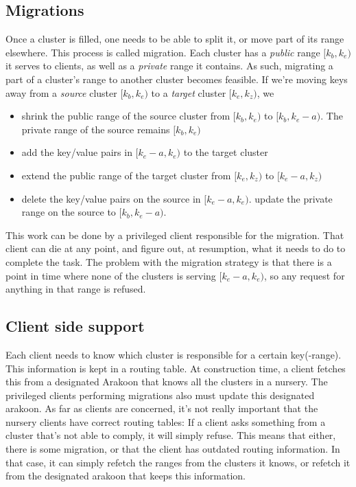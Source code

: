 \subsection{Migrations}
Once a cluster is filled, one needs to be able to split it, or move part of its range elsewhere. This process is called migration.
Each cluster has a \emph{public} range $[k_b,k_e)$ it serves to clients, as well as a \emph{private} range it contains. 
As such, migrating a part of a cluster's range to another cluster becomes feasible. 
If we're moving keys away from a \emph{source} cluster $[k_b, k_e)$ 
to a \emph{target} cluster $[k_e, k_z)$, we
\begin{itemize}
\item{} shrink the public range of the source cluster from 
$[k_b, k_e)$ to $[k_b, k_e - a)$. 
The private range of the source remains $[k_b, k_e)$
\item{} add the key/value pairs in $[k_e - a,k_e)$ to the target cluster
\item{} extend the public range of the target cluster from
$[k_e,k_z)$ to $[k_e - a, k_z)$
\item{} delete the key/value pairs on the source in $[k_e -a,k_e)$.
        update the private range on the source to $[k_b, k_e-a)$.
\end{itemize}
This work can be done by a privileged client responsible for the migration. 
That client can die at any point, and figure out, at resumption, what it needs to do to complete the task. 
The problem with the migration strategy is that there is a point in time where none of the clusters is serving $[k_e -a, k_e)$, so any request for anything in that range is refused.

\subsection{Client side support}
Each client needs to know which cluster is responsible for a certain key(-range). 
This information is kept in a routing table. At construction time, a client fetches this from a designated Arakoon that knows all the clusters in a nursery. 
The privileged clients performing migrations also must update this designated arakoon. 
As far as clients are concerned, it's not really important that the nursery clients have correct routing tables: 
If a client asks something from a cluster that's not able to comply, it will simply refuse. 
This means that either, there is some migration, or that the client has outdated routing information. 
In that case, it can simply refetch the ranges from the clusters it knows, or refetch it from the designated arakoon that keeps this information.
